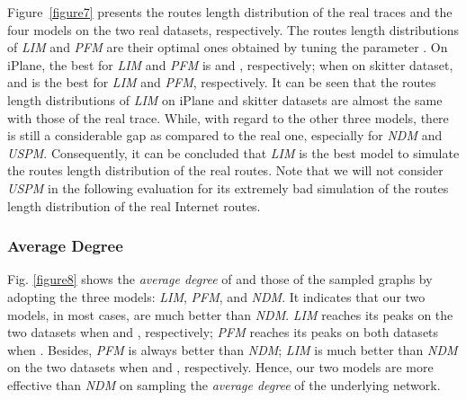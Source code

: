 \documentclass[a4paper]{llncs}
\begin{document}
Figure~\ref{figure7} presents the routes length distribution of the real
traces and the four models on the two real datasets, respectively. The routes length distributions of \textit{LIM} and \textit{PFM} are their optimal ones obtained by tuning the parameter . On iPlane, the best  for \textit{LIM} and
\textit{PFM} is  and , respectively; when on skitter dataset,  and  is the best for \textit{LIM} and \textit{PFM}, respectively. It can be seen that the routes length
distributions of \textit{LIM} on iPlane and skitter datasets are
almost the same with those of the real trace. While, with regard to the other
three models, there is still a considerable gap as compared to the real one,
especially for \textit{NDM} and \textit{USPM}. Consequently, it
can be concluded that \textit{LIM} is the best model to
simulate the routes length distribution of the real routes. Note that we will not consider \textit{USPM} in the following evaluation for its extremely bad simulation of the routes length distribution of the real Internet routes.

\begin{figure*}[!t]
\centering
{}
\hspace{2em}
\vspace{-1.7em}
\caption{The {\it average degree} of the sampled graphs by using the three models, compared with that of , on two real datasets: iPlane and skitter, respectively.}
\label{figure8}
\vspace{-0.8em}
\end{figure*}



\subsubsection{Average Degree}
Fig. \ref{figure8} shows the {\it average degree} of  and
those of the sampled graphs by adopting the three models:
\textit{LIM}, \textit{PFM}, and \textit{NDM}. It indicates that our
two models, in most cases, are much better than \textit{NDM}. \textit{LIM} reaches its peaks on the two datasets when  and , respectively; \textit{PFM} reaches its peaks on both datasets when
. Besides,
\textit{PFM} is always better than \textit{NDM}; \textit{LIM} is much better than
\textit{NDM} on the two datasets when  and , respectively. Hence, our two models are more effective
than \textit{NDM} on sampling the {\it average degree} of the underlying network.
\end{document}
